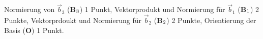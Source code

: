 \begin{bewertung}
Normierung von $\vec{b}_3$ ({\bf B$\mathstrut_3$}) 1 Punkt,
Vektorprodukt und Normierung für $\vec{b}_1$ ({\bf B$\mathstrut_1$}) 2 Punkte,
Vektorprdoukt und Normierung für $\vec{b}_2$ ({\bf B$\mathstrut_2$}) 2 Punkte,
Orientierung der Basis ({\bf O}) 1 Punkt.
\end{bewertung}

